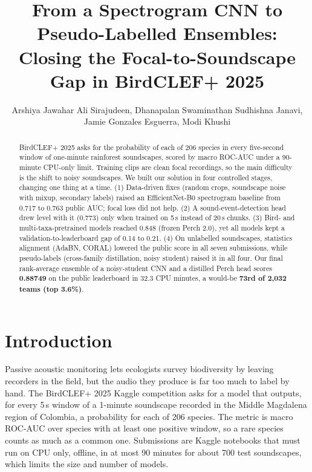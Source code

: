 \documentclass[letterpaper]{article} %
\title{From a Spectrogram CNN to Pseudo-Labelled Ensembles:\\Closing the Focal-to-Soundscape Gap in BirdCLEF+ 2025}
\author{
    Arshiya Jawahar Ali Sirajudeen,
    Dhanapalan Swaminathan Sudhishna Janavi,\\
    Jamie Gonzales Esguerra,
    Modi Khushi
}
\begin{document}
\maketitle

\begin{abstract}
BirdCLEF+ 2025 asks for the probability of each of 206 species in every five-second window of one-minute rainforest soundscapes, scored by macro ROC-AUC under a 90-minute CPU-only limit. Training clips are clean focal recordings, so the main difficulty is the shift to noisy soundscapes. We built our solution in four controlled stages, changing one thing at a time. (1) Data-driven fixes (random crops, soundscape noise with mixup, secondary labels) raised an EfficientNet-B0 spectrogram baseline from 0.717 to 0.763 public AUC; focal loss did not help. (2) A sound-event-detection head drew level with it (0.773) only when trained on 5\,s instead of 20\,s chunks. (3) Bird- and multi-taxa-pretrained models reached 0.848 (frozen Perch 2.0), yet all models kept a validation-to-leaderboard gap of 0.14 to 0.21. (4) On unlabelled soundscapes, statistics alignment (AdaBN, CORAL) lowered the public score in all seven submissions, while pseudo-labels (cross-family distillation, noisy student) raised it in all four. Our final rank-average ensemble of a noisy-student CNN and a distilled Perch head scores \textbf{0.88749} on the public leaderboard in 32.3 CPU minutes, a would-be \textbf{73rd of 2,032 teams (top 3.6\%)}.
\end{abstract}

\begin{links}
\end{links}

\section{Introduction}
Passive acoustic monitoring lets ecologists survey biodiversity by leaving recorders in the field, but the audio they produce is far too much to label by hand. The BirdCLEF+ 2025 Kaggle competition \citep{canas2025birdclef} asks for a model that outputs, for every 5\,s window of a 1-minute soundscape recorded in the Middle Magdalena region of Colombia, a probability for each of 206 species. The metric is macro ROC-AUC over species with at least one positive window, so a rare species counts as much as a common one. Submissions are Kaggle notebooks that must run on CPU only, offline, in at most 90 minutes for about 700 test soundscapes, which limits the size and number of models.
\end{document}
